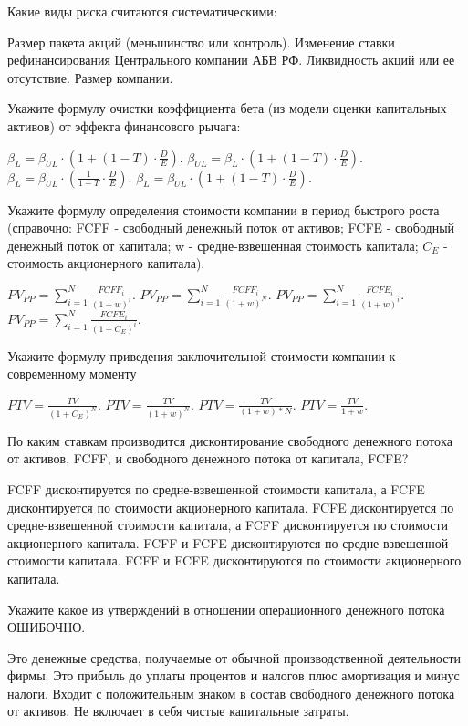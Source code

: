 \documentclass[12pt, table]{exam}
\begin{document}
\begin{questions}
\begin{multicols}{2}
\question Какие виды риска считаются систематическими:
\begin{choices}
	\choice Размер пакета акций (меньшинство или контроль).
	\CC Изменение ставки рефинансирования Центрального компании АБВ РФ.
	\choice Ликвидность акций или ее отсутствие.
	\choice Размер компании.
\end{choices}

\question Укажите формулу очистки коэффициента бета (из модели оценки капитальных активов) от эффекта финансового рычага:
\begin{choices}
	\CC $\beta_{L}=\beta_{UL} \cdot \left(1+(1-T)\cdot \frac{D}{E} \right)$.
	\choice $\beta_{UL}=\beta_{L} \cdot \left(1+(1-T)\cdot \frac{D}{E} \right)$.
	\choice $\beta_{L}=\beta_{UL} \cdot \left(\frac{1}{1-T} \cdot \frac{D}{E}\right)$.
	\choice $\beta_{L}=\beta_{UL} \cdot \left(1+(1-T)\cdot \frac{D}{E} \right)$.
\end{choices}

\question Укажите формулу определения стоимости компании в период быстрого роста (справочно: FCFF - свободный денежный поток от активов; FCFE - свободный денежный поток от капитала; w - средне-взвешенная стоимость капитала; $C_E$ - стоимость акционерного капитала).
\begin{choices}
	\CC $PV_{PP}=\sum_{i=1}^{N}\frac{FCFF_i}{(1+w)^i}$. 
	\choice $PV_{PP}=\sum_{i=1}^{N}\frac{FCFF_i}{(1+w)^N}$. 
	\choice $PV_{PP}=\sum_{i=1}^{N}\frac{FCFE_i}{(1+w)^i}$. 
	\choice $PV_{PP}=\sum_{i=1}^{N}\frac{FCFE_i}{(1+C_E)^i}$. 
\end{choices}

\question Укажите формулу приведения заключительной стоимости компании к современному моменту
\begin{choices}
	\choice $PTV=\frac{TV}{(1+C_E)^N}$.
	\CC $PTV=\frac{TV}{(1+w)^N}$.
	\choice $PTV=\frac{TV}{(1+w)*N}$.
	\choice $PTV=\frac{TV}{1+w}$.
\end{choices}
\question По каким ставкам производится дисконтирование свободного денежного потока от активов, FCFF, и свободного денежного потока от капитала, FCFE?
\begin{choices}
	\CC FCFF дисконтируется по средне-взвешенной стоимости капитала, а FCFE дисконтируется по стоимости акционерного капитала. 
	\choice FCFE дисконтируется по средне-взвешенной стоимости капитала, а FCFF дисконтируется по стоимости акционерного капитала.
	\choice FCFF и FCFE дисконтируются по средне-взвешенной стоимости капитала.
	\choice FCFF и FCFE дисконтируются по стоимости акционерного капитала.
\end{choices}
\question Укажите какое из утверждений в отношении операционного денежного потока ОШИБОЧНО.
\begin{choices}
	\choice Это денежные средства, получаемые от обычной производственной деятельности фирмы. 
	\choice Это прибыль до уплаты процентов и налогов плюс амортизация и минус налоги.
	\choice Входит с положительным знаком в состав свободного денежного потока от активов.
	\CC Не включает в себя чистые капитальные затраты.
\end{choices}


\end{multicols}
\end{questions}
\end{document}
